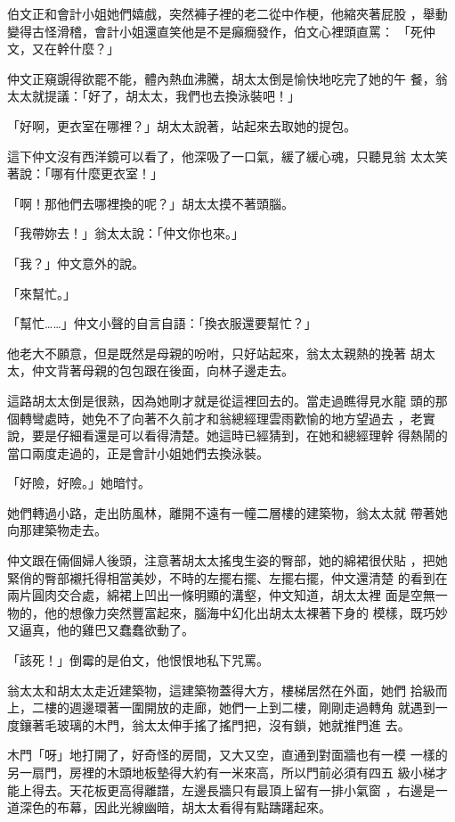 伯文正和會計小姐她們嬉戲，突然褲子裡的老二從中作梗，他縮夾著屁股
，舉動變得古怪滑稽，會計小姐還直笑他是不是癲癇發作，伯文心裡頭直罵：
「死仲文，又在幹什麼？」

仲文正窺覬得欲罷不能，體內熱血沸騰，胡太太倒是愉快地吃完了她的午
餐，翁太太就提議：「好了，胡太太，我們也去換泳裝吧！」

「好啊，更衣室在哪裡？」胡太太說著，站起來去取她的提包。

這下仲文沒有西洋鏡可以看了，他深吸了一口氣，緩了緩心魂，只聽見翁
太太笑著說：「哪有什麼更衣室！」

「啊！那他們去哪裡換的呢？」胡太太摸不著頭腦。

「我帶妳去！」翁太太說：「仲文你也來。」

「我？」仲文意外的說。

「來幫忙。」

「幫忙……」仲文小聲的自言自語：「換衣服還要幫忙？」

他老大不願意，但是既然是母親的吩咐，只好站起來，翁太太親熱的挽著
胡太太，仲文背著母親的包包跟在後面，向林子邊走去。

這路胡太太倒是很熟，因為她剛才就是從這裡回去的。當走過瞧得見水龍
頭的那個轉彎處時，她免不了向著不久前才和翁總經理雲雨歡愉的地方望過去
，老實說，要是仔細看還是可以看得清楚。她這時已經猜到，在她和總經理幹
得熱鬧的當口兩度走過的，正是會計小姐她們去換泳裝。

「好險，好險。」她暗忖。

她們轉過小路，走出防風林，離開不遠有一幢二層樓的建築物，翁太太就
帶著她向那建築物走去。

仲文跟在倆個婦人後頭，注意著胡太太搖曳生姿的臀部，她的綿裙很伏貼
，把她緊俏的臀部襯托得相當美妙，不時的左擺右擺、左擺右擺，仲文還清楚
的看到在兩片圓肉交合處，綿裙上凹出一條明顯的溝壑，仲文知道，胡太太裡
面是空無一物的，他的想像力突然豐富起來，腦海中幻化出胡太太裸著下身的
模樣，既巧妙又逼真，他的雞巴又蠢蠢欲動了。

「該死！」倒霉的是伯文，他恨恨地私下咒罵。

翁太太和胡太太走近建築物，這建築物蓋得大方，樓梯居然在外面，她們
拾級而上，二樓的週邊環著一圍開放的走廊，她們一上到二樓，剛剛走過轉角
就遇到一度鑲著毛玻璃的木門，翁太太伸手搖了搖門把，沒有鎖，她就推門進
去。

木門「呀」地打開了，好奇怪的房間，又大又空，直通到對面牆也有一模
一樣的另一扇門，房裡的木頭地板墊得大約有一米來高，所以門前必須有四五
級小梯才能上得去。天花板更高得離譜，左邊長牆只有最頂上留有一排小氣窗
，右邊是一道深色的布幕，因此光線幽暗，胡太太看得有點躊躇起來。


